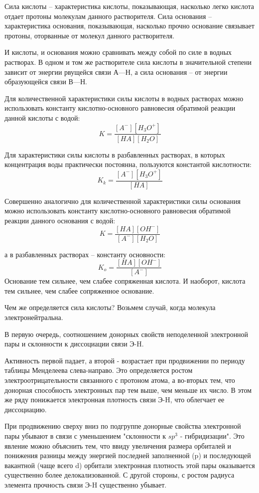 \documentclass[14pt,a4paper]{scrartcl}
\begin{document}
Сила кислоты – характеристика кислоты, показывающая, насколько легко кислота отдает протоны молекулам данного растворителя.
Сила основания – характеристика основания, показывающая, насколько прочно основание связывает протоны, оторванные от молекул данного растворителя.

 И кислоты, и основания можно сравнивать между собой по силе в водных растворах. В одном и том же растворителе сила кислоты в значительной степени зависит от энергии рвущейся связи А—Н, а сила основания – от энергии образующейся связи В—Н.

Для количественной характеристики силы кислоты в водных растворах можно использовать константу кислотно-основного равновесия обратимой реакции данной кислоты с водой: 
$$K = \frac{\left[A^-\right]\left[H_3O^+\right]}{\left[HA\right]\left[H_2O\right]}$$

Для характеристики силы кислоты в разбавленных растворах, в которых концентрация воды практически постоянна, пользуются константой кислотности: 
$$K_k = \frac{\left[A^-\right]\left[H_3O^+\right]}{\left[HA\right]}$$

Совершенно аналогично для количественной характеристики силы основания можно использовать константу кислотно-основного равновесия обратимой реакции данного основания с водой:
$$K = \frac{\left[HA\right]\left[OH^-\right]}{\left[A^-\right]\left[H_2O\right]}$$

а в разбавленных растворах – константу основности: 
$$K_o = \frac{\left[HA\right]\left[OH^-\right]}{\left[A^-\right]}$$
Основание тем сильнее, чем слабее сопряженная кислота. И наоборот, кислота тем сильнее, чем слабее сопряженное основание.

Чем же определяется сила кислоты? Возьмем случай, когда молекула электронейтральна.

В первую очередь, соотношением донорных свойств неподеленной электронной пары и склонности к диссоциации связи Э-H.

Активность первой падает, а второй - возрастает при продвижении по периоду таблицы Менделеева слева-направо. Это определяется ростом электроотрицательности связанного с протоном атома, а во-вторых тем, что донорная способность электронных пар тем выше, чем меньше их число. В этом же ряду понижается электронная плотность связи Э-H, что облегчает ее диссоциацию.

При продвижению сверху вниз по подгруппе донорные свойства электронной пары убывают в связи с уменьшением "склонности к $sp^3$ - гибридизации". Это явление можно объяснить тем, что ввиду увеличения размера орбиталей и понижения разницы между энергией последней заполненной (p) и последующей вакантной (чаще всего d) орбитали электронная плотность этой пары оказывается существенно более делокализованной. С другой стороны, с ростом радиуса элемента прочность связи Э-H существенно убывает.
\end{document}

